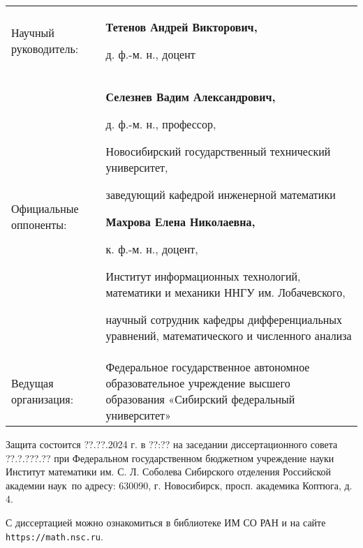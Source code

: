 \documentclass[a5paper,9pt,twoside]{extarticle} %
\begin{document}
\vspace{0.008\paperheight plus1fill}
\noindent%
\begin{tabular}{p{} p{}}
    Научный руководитель:   & \textbf{Тетенов Андрей Викторович,}\par
    								д. ф.-м. н., доцент
                              
                              \vspace{0.013\paperheight}\\
    Официальные оппоненты:  &
    {%
        \textbf{Селезнев Вадим Александрович,}\par
        д. ф.-м. н., профессор,\par
        Новосибирский государственный технический университет,\par
        заведующий кафедрой инженерной математики\par
        \vspace{0.01\paperheight}
        \textbf{Махрова Елена Николаевна,}\par
        к. ф.-м. н., доцент,\par
        Институт информационных технологий, математики и механики ННГУ им. Лобачевского,\par
        научный сотрудник кафедры дифференциальных уравнений, математического и численного анализа
        
    }%
    \vspace{0.013\paperheight} \\
    Ведущая организация:    &
    Федеральное государственное автономное образовательное учреждение высшего образования «Сибирский федеральный университет»
\end{tabular}
\vspace{0.008\paperheight plus1fill}

\noindent Защита состоится ??.??.2024 г. в ??:?? на заседании диссертационного совета ??.?.???.?? при Федеральном государственном бюджетном учреждение науки
Институт математики им. С. Л. Соболева Сибирского отделения Российской академии наук~по адресу: 630090, г. Новосибирск, просп. академика Коптюга, д. 4.

\vspace{0.008\paperheight plus1fill}
\noindent С диссертацией можно ознакомиться в библиотеке ИМ СО РАН и на сайте \texttt{https://math.nsc.ru}.

\end{document}
